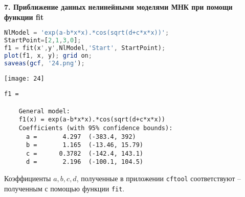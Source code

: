 \documentclass[a4paper]{article}
\begin{document}
\newpage
{\textbf{7. Приближение данных нелинейными моделями МНК при помощи функции fit}}
\begin{lstlisting}[language=Octave, firstnumber=80]
NlModel = 'exp(a-b*x*x).*cos(sqrt(d+c*x*x))';
StartPoint=[2,1,3,0];
f1 = fit(x',y',NlModel,'Start', StartPoint);
plot(f1, x, y); grid on;
saveas(gcf, '24.png');
\end{lstlisting}
\begin{center}
    \texttt{[image: 24]}
\end{center}
{\singlespacing
\begin{verbatim}
f1 =

    General model:
    f1(x) = exp(a-b*x*x).*cos(sqrt(d+c*x*x))
    Coefficients (with 95% confidence bounds):
      a =       4.297  (-383.4, 392)
      b =       1.165  (-13.46, 15.79)
      c =      0.3782  (-142.4, 143.1)
      d =       2.196  (-100.1, 104.5)
\end{verbatim}}
Коэффициенты $a,b,c,d$, полученные в приложении \texttt{cftool} соответствуют -- полученным с помощью функции \texttt{fit}.
\end{document}
